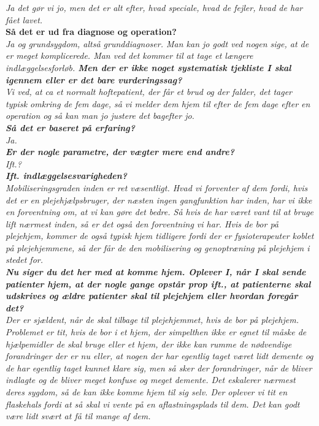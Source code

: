 \noindent
\textit{Ja det gør vi jo, men det er alt efter, hvad speciale, hvad de fejler, hvad de har fået lavet.}  \\
\noindent
\textbf{Så det er ud fra diagnose og operation?} \\
\noindent
\textit{Ja og grundsygdom, altså grunddiagnoser. Man kan jo godt ved nogen sige, at de er meget komplicerede. Man ved det kommer til at tage et længere indlæggelsesforløb.
\textbf{Men der er ikke noget systematisk tjekliste I skal igennem eller er det bare vurderingssag?} \\
\noindent
\textit{Vi ved, at ca et normalt hoftepatient, der får et brud og der falder, det tager typisk omkring de fem dage, så vi melder dem hjem til efter de fem dage efter en operation og så kan man jo justere det bagefter jo.} \\
\noindent
\textbf{Så det er baseret på erfaring?} \\
\noindent
\textit{Ja.} \\
\noindent
\textbf{Er der nogle parametre, der vægter mere end andre? } \\
\noindent
\textit{Ift.?} \\
\noindent
\textbf{Ift. indlæggelsesvarigheden?} \\
\noindent
\textit{Mobiliseringsgraden inden er ret væsentligt. Hvad vi forventer af dem fordi, hvis det er en plejehjælpsbruger, der næsten ingen gangfunktion har inden, har vi ikke en forventning om, at vi kan gøre det bedre. Så hvis de har været vant til at bruge lift nærmest inden, så er det også den forventning vi har. Hvis de bor på plejehjem, kommer de også typisk hjem tidligere fordi der er fysioterapeuter koblet på plejehjemmene, så der får de den mobilisering og genoptræning på plejehjem i stedet for. } \\
\noindent
\textbf{Nu siger du det her med at komme hjem. Oplever I, når I skal sende patienter hjem, at der nogle gange opstår prop ift., at patienterne skal udskrives og ældre patienter skal til plejehjem eller hvordan foregår det? } \\
\noindent
\textit{Der er sjældent, når de skal tilbage til plejehjemmet, hvis de bor på plejehjem. Problemet er tit, hvis de bor i et hjem, der simpelthen ikke er egnet til måske de hjælpemidler de skal bruge eller et hjem, der ikke kan rumme de nødvendige forandringer der er nu eller, at nogen der har egentlig taget været lidt demente og de har egentlig taget kunnet klare sig, men så sker der forandringer, når de bliver indlagte og de bliver meget konfuse og meget demente. Det eskalerer nærmest deres sygdom, så de kan ikke komme hjem til sig selv. Der oplever vi tit en flaskehals fordi at så skal vi vente på en aflastningsplads til dem. Det kan godt være lidt svært at få til mange af dem.} \\
}
